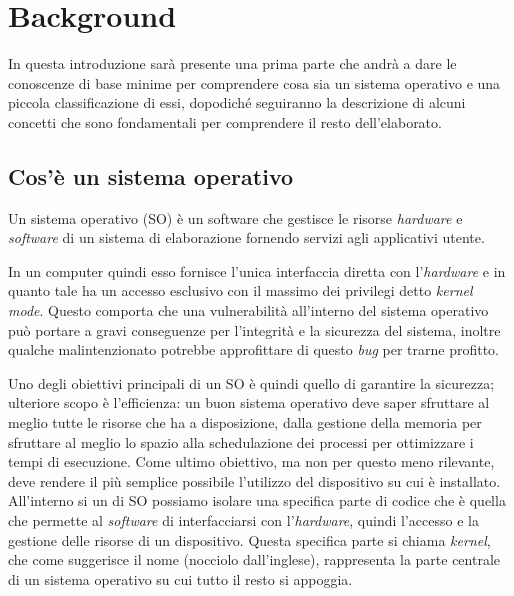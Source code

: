 \chapter{Background}
In questa introduzione sarà presente una prima parte che andrà a dare le conoscenze di base minime per comprendere cosa sia un sistema operativo e una piccola classificazione di essi, dopodiché seguiranno la descrizione di alcuni concetti che sono fondamentali per comprendere il resto dell'elaborato.

\section{Cos'è un sistema operativo}
Un sistema operativo (SO) è un software che gestisce le risorse \textit{hardware} e \textit{software} di un sistema di elaborazione fornendo servizi agli applicativi utente.

In un computer quindi esso fornisce l'unica interfaccia diretta con l'\textit{hardware} e in quanto tale ha un accesso esclusivo con il massimo dei privilegi detto \textit{kernel mode}. Questo comporta che una vulnerabilità all'interno del sistema operativo può portare a gravi conseguenze per l'integrità e la sicurezza del sistema, inoltre qualche malintenzionato potrebbe approfittare di questo \textit{bug} per trarne profitto.

Uno degli obiettivi principali di un SO è quindi quello di garantire la sicurezza; ulteriore scopo è l'efficienza: un buon sistema operativo deve saper sfruttare al meglio tutte le risorse che ha a disposizione, dalla gestione della memoria per sfruttare al meglio lo spazio alla schedulazione dei processi per ottimizzare i tempi di esecuzione. Come ultimo obiettivo, ma non per questo meno rilevante, deve rendere il più semplice possibile l'utilizzo del dispositivo su cui è installato.
All'interno si un di SO possiamo isolare una specifica parte di codice che è quella che permette al \textit{software} di interfacciarsi con l'\textit{hardware}, quindi l'accesso e la gestione delle risorse di un dispositivo. Questa specifica parte si chiama \textit{kernel}, che come suggerisce il nome (nocciolo dall'inglese), rappresenta la parte centrale di un sistema operativo su cui tutto il resto si appoggia.
\newpage


